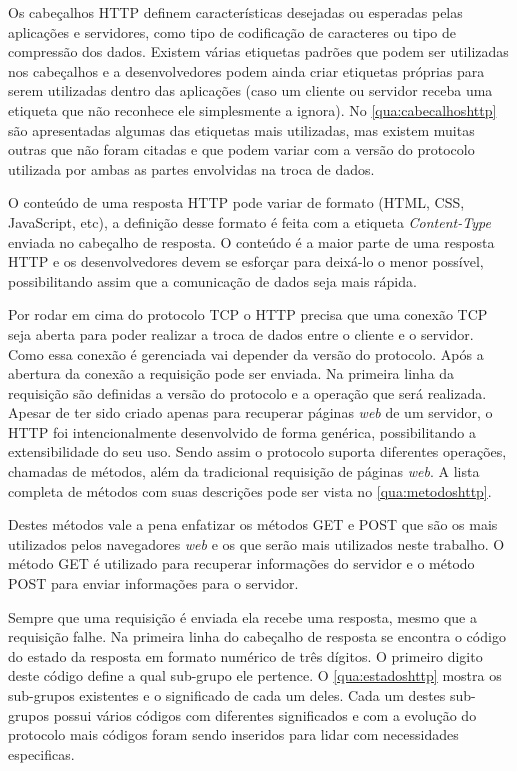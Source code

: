 Os cabeçalhos HTTP definem características desejadas ou esperadas pelas aplicações e servidores, como tipo de codificação de caracteres ou tipo de compressão dos dados. Existem várias etiquetas padrões que podem ser utilizadas nos cabeçalhos e a desenvolvedores podem ainda criar etiquetas próprias para serem utilizadas dentro das aplicações (caso um cliente ou servidor receba uma etiqueta que não reconhece ele simplesmente a ignora). No \autoref{qua:cabecalhoshttp} são apresentadas algumas das etiquetas mais utilizadas, mas existem muitas outras que não foram citadas e que podem variar com a versão do protocolo utilizada por ambas as partes envolvidas na troca de dados.



O conteúdo de uma resposta HTTP pode variar de formato (HTML, CSS, JavaScript, etc), a definição desse formato é feita com a etiqueta \textit{Content-Type} enviada no cabeçalho de resposta. O conteúdo é a maior parte de uma resposta HTTP e os desenvolvedores devem se esforçar para deixá-lo o menor possível, possibilitando assim que a comunicação de dados seja mais rápida.

Por rodar em cima do protocolo TCP o HTTP precisa que uma conexão TCP seja aberta para poder realizar a troca de dados entre o cliente e o servidor. Como essa conexão é gerenciada vai depender da versão do protocolo. Após a abertura da conexão a requisição pode ser enviada. Na primeira linha da requisição são definidas a versão do protocolo e a operação que será realizada. Apesar de ter sido criado apenas para recuperar páginas \textit{web} de um servidor, o HTTP foi intencionalmente desenvolvido de forma genérica, possibilitando a extensibilidade do seu uso. Sendo assim o protocolo suporta diferentes operações, chamadas de métodos, além da tradicional requisição de páginas \textit{web}. A lista completa de métodos com suas descrições pode ser vista no \autoref{qua:metodoshttp}.



Destes métodos vale a pena enfatizar os métodos GET e POST que são os mais utilizados pelos navegadores \textit{web} e os que serão mais utilizados neste trabalho. O método GET é utilizado para recuperar informações do servidor e o método POST para enviar informações para o servidor.

Sempre que uma requisição é enviada ela recebe uma resposta, mesmo que a requisição falhe. Na primeira linha do cabeçalho de resposta se encontra o código do estado da resposta em formato numérico de três dígitos. O primeiro digito deste código define a qual sub-grupo ele pertence. O \autoref{qua:estadoshttp} mostra os sub-grupos existentes e o significado de cada um deles. Cada um destes sub-grupos possui vários códigos  com diferentes significados e com a evolução do protocolo mais códigos foram sendo inseridos para lidar com necessidades especificas.

